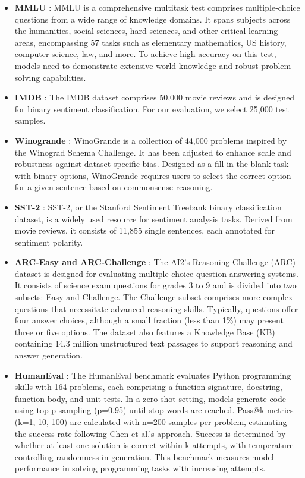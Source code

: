 \documentclass{article}
\begin{document}
\begin{itemize}
    \item \textbf{MMLU} \citep{maas-EtAl:2011:ACL-HLT2011}: MMLU is a comprehensive multitask test comprises multiple-choice questions from a wide range of knowledge domains. It spans subjects across the humanities, social sciences, hard sciences, and other critical learning areas, encompassing 57 tasks such as elementary mathematics, US history, computer science, law, and more. To achieve high accuracy on this test, models need to demonstrate extensive world knowledge and robust problem-solving capabilities.
    \item \textbf{IMDB} \citep{maas-EtAl:2011:ACL-HLT2011}: The IMDB dataset comprises 50,000 movie reviews and is designed for binary sentiment classification. For our evaluation, we select 25,000 test samples.
    \item \textbf{Winogrande} \citep{sakaguchi2021winogrande}: WinoGrande is a collection of 44,000 problems inspired by the Winograd Schema Challenge. It has been adjusted to enhance scale and robustness against dataset-specific bias. Designed as a fill-in-the-blank task with binary options, WinoGrande requires users to select the correct option for a given sentence based on commonsense reasoning.
    \item \textbf{SST-2} \citep{socher-etal-2013-recursive}: SST-2, or the Stanford Sentiment Treebank binary classification dataset, is a widely used resource for sentiment analysis tasks. Derived from movie reviews, it consists of 11,855 single sentences, each annotated for sentiment polarity. 
    \item \textbf{ARC-Easy and ARC-Challenge} \citep{yadav2019quick}: The AI2’s Reasoning Challenge (ARC) dataset is designed for evaluating multiple-choice question-answering systems. It consists of science exam questions for grades 3 to 9 and is divided into two subsets: Easy and Challenge. The Challenge subset comprises more complex questions that necessitate advanced reasoning skills. Typically, questions offer four answer choices, although a small fraction (less than 1\%) may present three or five options. The dataset also features a Knowledge Base (KB) containing 14.3 million unstructured text passages to support reasoning and answer generation.
    \item \textbf{HumanEval} \citep{chen2021evaluating}: The HumanEval benchmark evaluates Python programming skills with 164 problems, each comprising a function signature, docstring, function body, and unit tests. In a zero-shot setting, models generate code using top-p sampling (p=0.95) until stop words are reached. Pass@k metrics (k=1, 10, 100) are calculated with n=200 samples per problem, estimating the success rate following Chen et al.'s approach. Success is determined by whether at least one solution is correct within k attempts, with temperature controlling randomness in generation. This benchmark measures model performance in solving programming tasks with increasing attempts.

\end{itemize}
\end{document}
